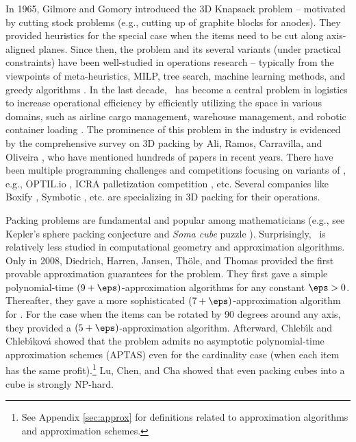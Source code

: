 In 1965, Gilmore and Gomory \cite{gilmore1965multistage} introduced the 3D Knapsack problem -- motivated by cutting stock problems (e.g., cutting up of graphite blocks for anodes). They provided heuristics for the special case when the items need to be cut along axis-aligned planes.
Since then, the problem and its several variants (under practical constraints) have been well-studied in operations research -- typically from the viewpoints of meta-heuristics, MILP, tree search, machine learning methods, and greedy algorithms \cite{cacchiani2022knapsack, silva2019exact}.
In the last decade, \tdk~has become a central problem in logistics to increase operational efficiency by efficiently utilizing the space in various domains, such as airline cargo management, warehouse management, and robotic container loading \cite{ali2022line}.
The prominence of this problem in the industry is evidenced by the comprehensive survey on 3D packing by Ali, Ramos, Carravilla, and Oliveira \cite{ali2022line}, who have mentioned hundreds of papers in recent years.  
There have been multiple programming challenges and competitions focusing on variants of \tdk, e.g., OPTIL.io \cite{optil}, ICRA palletization competition \cite{vmac}, etc.   
Several companies like Boxify \cite{boxify}, Symbotic \cite{symbotic}, etc. are specializing in 3D packing for their operations.  

Packing problems are fundamental and popular among mathematicians (e.g., see Kepler's sphere packing conjecture \cite{lagarias2011kepler} and {\em Soma cube} puzzle \cite{goodman2019soma}). 
Surprisingly, \tdk~is relatively less studied in computational geometry and approximation algorithms. 
Only in 2008, Diedrich, Harren, Jansen, Th{\"{o}}le, and Thomas \cite{3d-knapsack} provided the first provable approximation guarantees for the problem. They first gave a simple polynomial-time $(9+\eps)$-approximation algorithms for any constant $\eps>0$. Thereafter, they gave a more sophisticated $(7+\eps)$-approximation algorithm for \tdk. For the case when the items can be rotated by 90 degrees around any axis, they provided a $(5+\eps)$-approximation algorithm. 
Afterward, Chleb{\'{\i}}k and Chleb{\'{\i}}kov{\'{a}} \cite{ChlebikC09} showed that the problem admits no asymptotic polynomial-time approximation schemes (APTAS) even for the cardinality case (when each item has the same profit).\footnote{See Appendix \ref{sec:approx} for definitions related to approximation algorithms and approximation schemes.} Lu, Chen, and Cha \cite{lu2015packing1} showed that even packing cubes into a cube is strongly NP-hard. 


